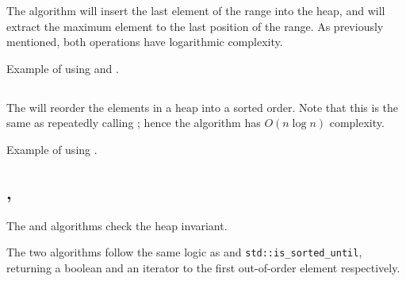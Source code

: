 The  algorithm will insert the last element of the range into the heap, and  will extract the maximum element to the last position of the range. As previously mentioned, both operations have logarithmic complexity.

\begin{codebox}[breakable]{\href{https://compiler-explorer.com/z/h34Eh5T7a}{\ExternalLink}}
\footnotesize Example of using  and .
\tcblower
{}
\end{codebox}

\subsection{\texorpdfstring{}{\texttt{std::sort\_heap}}}

The  will reorder the elements in a heap into a sorted order. Note that this is the same as repeatedly calling ; hence the algorithm has $O(n\log n)$ complexity.


\begin{codebox}[]{\href{https://compiler-explorer.com/z/odrjGK7xb}{\ExternalLink}}
\footnotesize Example of using .
\tcblower
{}
\end{codebox}

\subsection{\texorpdfstring{, }{\texttt{std::is\_heap}, \texttt{std::is\_heap\_until}}}

The  and  algorithms check the heap invariant.



The two algorithms follow the same logic as  and \texttt{std::is\-\_sorted\-\_until}, returning a boolean and an iterator to the first out-of-order element respectively.

